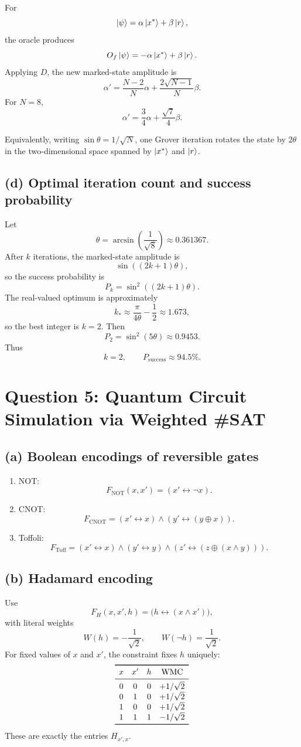 \documentclass[11pt,a4paper]{article}
\newcommand{\WMC}{\operatorname{WMC}}
\begin{document}
For
\[
\ket\psi=\alpha\ket{x^*}+\beta\ket r,
\]
the oracle produces
\[
O_f\ket\psi=-\alpha\ket{x^*}+\beta\ket r.
\]
Applying $D$, the new marked-state amplitude is
\[
\boxed{
\alpha'=\frac{N-2}{N}\alpha+\frac{2\sqrt{N-1}}{N}\beta}.
\]
For $N=8$,
\[
\boxed{\alpha'=\frac34\alpha+\frac{\sqrt7}{4}\beta}.
\]

Equivalently, writing $\sin\theta=1/\sqrt N$, one Grover iteration rotates the state
by $2\theta$ in the two-dimensional space spanned by $\ket{x^*}$ and $\ket r$.

\subsection*{(d) Optimal iteration count and success probability}
Let
\[
\theta=\arcsin\left(\frac1{\sqrt8}\right)\approx0.361367.
\]
After $k$ iterations, the marked-state amplitude is
\[
\sin((2k+1)\theta),
\]
so the success probability is
\[
P_k=\sin^2((2k+1)\theta).
\]
The real-valued optimum is approximately
\[
k_*\approx\frac{\pi}{4\theta}-\frac12\approx1.673,
\]
so the best integer is $k=2$. Then
\[
P_2=\sin^2(5\theta)\approx0.9453.
\]
Thus
\[
\boxed{k=2,\qquad P_{\mathrm{success}}\approx94.5\%.}
\]

\newpage
\section*{Question 5: Quantum Circuit Simulation via Weighted \#SAT}

\subsection*{(a) Boolean encodings of reversible gates}
\begin{enumerate}[label=(\roman*)]
  \item NOT:
  \[
  F_{\mathrm{NOT}}(x,x')=(x'\leftrightarrow\neg x).
  \]
  \item CNOT:
  \[
  F_{\mathrm{CNOT}}=(x'\leftrightarrow x)
  \land(y'\leftrightarrow(y\oplus x)).
  \]
  \item Toffoli:
  \[
  F_{\mathrm{Toff}}=(x'\leftrightarrow x)
  \land(y'\leftrightarrow y)
  \land(z'\leftrightarrow(z\oplus(x\land y))).
  \]
\end{enumerate}

\subsection*{(b) Hadamard encoding}
Use
\[
F_H(x,x',h)=\bigl(h\leftrightarrow(x\land x')\bigr),
\]
with literal weights
\[
W(h)=-\frac1{\sqrt2},
\qquad
W(\neg h)=\frac1{\sqrt2}.
\]
For fixed values of $x$ and $x'$, the constraint fixes $h$ uniquely:
\[
\begin{array}{c c c c}
\toprule
x&x'&h&\WMC\\
\midrule
0&0&0&+1/\sqrt2\\
0&1&0&+1/\sqrt2\\
1&0&0&+1/\sqrt2\\
1&1&1&-1/\sqrt2\\
\bottomrule
\end{array}
\]
These are exactly the entries $H_{x',x}$.
\end{document}
